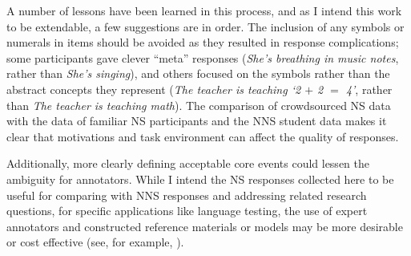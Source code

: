 A number of lessons have been learned in this process, and as I intend this work to be extendable, a few suggestions are in order. The inclusion of any symbols or numerals in items should be avoided as they resulted in response complications; some participants gave clever ``meta'' responses (\textit{She's breathing in music notes}, rather than \textit{She's singing}), and others focused on the symbols rather than the abstract concepts they represent (\textit{The teacher is teaching `2 $+$ 2 $=$ 4'}, rather than \textit{The teacher is teaching math}). The comparison of crowdsourced NS data with the data of familiar NS participants and the NNS student data makes it clear that motivations and task environment can affect the quality of responses.

Additionally, more clearly defining acceptable core events could lessen the ambiguity for annotators. While I intend the NS responses collected here to be useful for comparing with NNS responses and addressing related research questions, for specific applications like language testing, the use of expert annotators and constructed reference materials or models may be more desirable or cost effective (see, for example, \citet{somasundaran:chodorow:14}).

